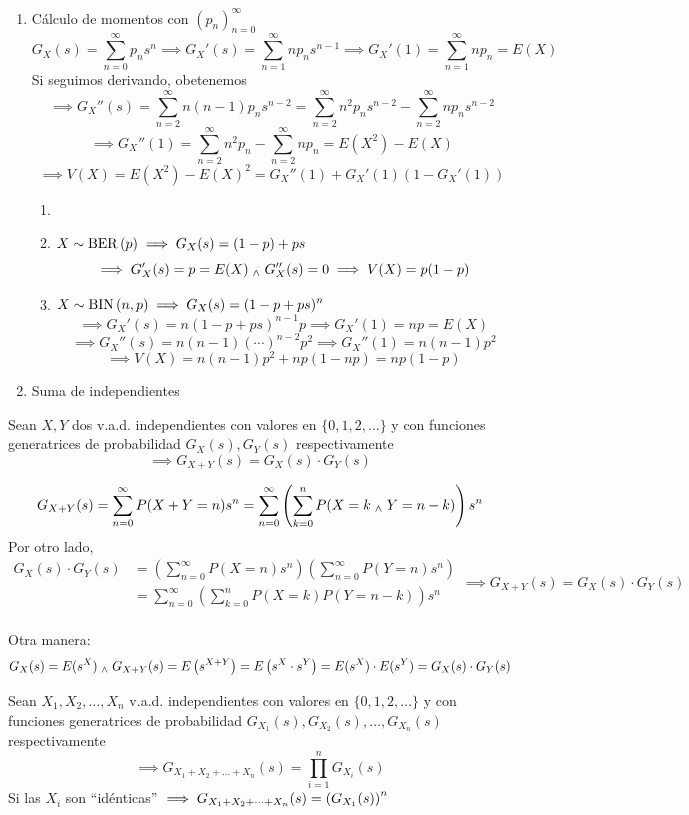 \begin{enumerate}
	\item Cálculo de momentos con $(p_n)_{n=0}^\infty$
	      \[ G_X(s)=\sum_{n=0}^\infty p_ns^n \implies G_X'(s) = \sum_{n=1}^{\infty} np_n s^{n-1} \implies G_X'(1) = \sum_{n=1}^{\infty} n p_n = E(X)\]
	      Si seguimos derivando, obetenemos
	      \[\implies G_X''(s)= \sum_{n=2}^{\infty} n(n-1) p_n s^{n-2} = \sum_{n=2}^{\infty} n^2 p_n s^{n-2} - \sum_{n=2}^{\infty} n p_n s^{n-2}\]
	      \[\implies G_X''(1) = \sum_{n=2}^{\infty} n^2 p_n - \sum_{n=2}^{\infty} n p_n = E(X^2) - E(X)\]
	      \[\implies V(X)=E(X^2) - E(X)^2 = G_X''(1) + G_X'(1)\left(1-G_X'(1)\right)\]
	      \begin{ejem}
		      \begin{enumerate}
			      \item[]
			      \item $\displaystyle X\sim\operatorname{BER}\left(p\right) \implies G_X(s)=(1-p)+ps$
			            \[\implies G_X'(s)=p=E(X) \; _{\wedge} \; G_X''(s)=0 \implies V(X)=p(1-p)\]
			      \item $\displaystyle X\sim\operatorname{BIN}\left(n, p\right) \implies G_X(s)=(1-p+ps)^n$ \[\implies G_X'(s)=n(1-p+ps)^{n-1}p \implies G_X'(1)=np=E(X)\]
			            \[\implies G_X''(s)=n(n-1)(\cdots)^{n-2}p^2 \implies G_X''(1)=n(n-1)p^2\]
			            \[\implies V(X)=n(n-1)p^2+np(1-np)=np(1-p)\]

		      \end{enumerate}
	      \end{ejem}
	\item Suma de independientes
\end{enumerate}
\begin{teo}
	Sean $X, Y$ dos v.a.d. independientes con valores en $\{0, 1, 2, \dots\}$ y con funciones generatrices de probabilidad $G_X(s), G_Y(s)$ respectivamente
	\[\implies G_{X+Y}(s)=G_X(s)\cdot G_Y(s)\]
	\begin{dem}
		\[G_{X+Y}(s)=\sum_{n=0}^\infty P(X+Y=n)s^n = \sum_{n=0}^\infty \left(\sum_{k=0}^n P(X=k \; _{\wedge} \; Y=n-k)\right)s^n\]
		Por otro lado,
		\[\begin{aligned}G_X(s)\cdot G_Y(s) & = \left(\sum_{n=0}^\infty P(X=n)s^n\right)\left(\sum_{n=0}^\infty P(Y=n)s^n\right) \\
                                  & = \sum_{n=0}^\infty \left(\sum_{k=0}^n P(X=k)P(Y=n-k)\right)s^n\end{aligned}\implies G_{X+Y}(s)=G_X(s)\cdot G_Y(s)\]
		\hfill \qedsymbol\\
		Otra manera:
		\[G_X(s)=E(s^X) \; _{\wedge} \; G_{X+Y}(s)=E\left(s^{X+Y}\right) = E\left(s^X\cdot s^Y\right)=E(s^X)\cdot E(s^Y) = G_X(s)\cdot G_Y(s)\]
	\end{dem}
\end{teo}
\begin{cor}
	Sean $X_1, X_2, \dots, X_n$ v.a.d. independientes con valores en $\{0, 1, 2, \dots\}$ y con funciones generatrices de probabilidad $G_{X_1}(s), G_{X_2}(s), \dots, G_{X_n}(s)$ respectivamente
	\[\implies G_{X_1+X_2+\dots+X_n}(s)=\prod_{i=1}^{n} G_{X_i}(s)\]
	Si las $X_i$ son ``idénticas'' $\displaystyle \implies
		G_{X_1+X_2+\dots+X_n}(s)=\left(G_{X_1}(s)\right)^n$
\end{cor}

